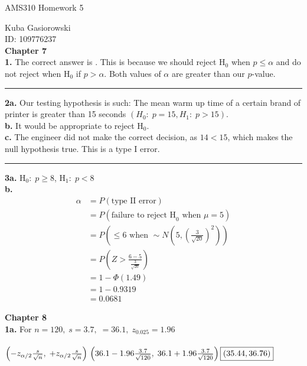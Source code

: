 \documentclass[12pt]{report}
\makeatletter
\newcommand*{\Xbar}{}%
\DeclareRobustCommand*{\Xbar}{%
	\mathpalette\@Xbar{}%
}
\newcommand*{\@Xbar}[2]{%
	\sbox0{$#1\mathrm{X}\m@th$}%
	\sbox2{$#1X\m@th$}%
	\rlap{%
		\hbox to\wd2{%
			\hfill
			$\overline{%
				\vrule width 0pt height\ht0 %
				\kern\wd0 %
			}$%
		}%
	}%
	\copy2 %
}
\newcommand*{\xbar}{}%
\DeclareRobustCommand*{\xbar}{%
	\mathpalette\@xbar{}%
}
\newcommand*{\@xbar}[2]{%
	\sbox0{$#1\mathrm{x}\m@th$}%
	\sbox2{$#1x\m@th$}%
	\rlap{%
		\hbox to\wd2{%
			\hfill
			$\overline{%
				\vrule width 0pt height\ht0 %
				\kern\wd0 %
			}$%
		}%
	}%
	\copy2 %
}
\newcommand{\sep}{\bigskip\hrule\bigskip}
\makeatother
\begin{document}
\Large
\centering
AMS310 Homework 5

\justify
\normalsize

Kuba Gasiorowski\\
ID: 109776237\\

\noindent \textbf{Chapter 7}\\

\noindent \textbf{1.} The correct answer is . This is because we should reject H$_0$ when $p \leq \alpha$ and do not reject when $\text{H}_0$ if $p > \alpha$. Both values of $\alpha$ are greater than our $p$-value.

\sep

\noindent \textbf{2a.} Our testing hypothesis is such: The mean warm up time of a certain brand of printer is greater than 15 seconds $\boxed{(H_0: \; p = 15, H_1: \; p > 15)}.$\\

\noindent \textbf{b.} It would be appropriate to reject $\boxed{\text{H}_0}$.\\

\noindent \textbf{c.} The engineer did not make the correct decision, as $14 < 15$, which makes the null hypothesis true. This is a type I error.

\sep

\noindent \textbf{3a.} H$_0 :\;p \geq 8$, H$_1 :\;p < 8$\\

\noindent \textbf{b.} 
\begin{align*}
	\alpha &= P(\text{type II error})\\
	&= P(\text{failure to reject H}_0 \text{ when } \mu = 5)\\
	&= P\left(\Xbar \leq 6\text{ when }\Xbar \sim N\left(5, \left(\frac{3}{\sqrt{20}}\right)^2\right)\right)\\ 
	&= P\left(Z > \frac{6-5}{\frac{3}{\sqrt{20}}}\right)\\
	&= 1-\Phi(1.49)\\
	&= 1-0.9319\\
	&= \boxed{0.0681}	
\end{align*}

\pagebreak
\noindent \textbf{Chapter 8}\\

\noindent \textbf{1a.} For $n = 120, \; s = 3.7, \; \xbar = 36.1, \; z_{0.025} = 1.96$\\\\
\begin{math}
	\left(\xbar - z_{\alpha/2}\frac{s}{\sqrt{n}}, \; \xbar + z_{\alpha/2}\frac{s}{\sqrt{n}}\right)\\
	 \left(36.1 - 1.96\frac{3.7}{\sqrt{120}}, \; 36.1 + 1.96\frac{3.7}{\sqrt{120}}\right)\\
	 \boxed{(35.44, 36.76)}\\
\end{math}
\end{document}
